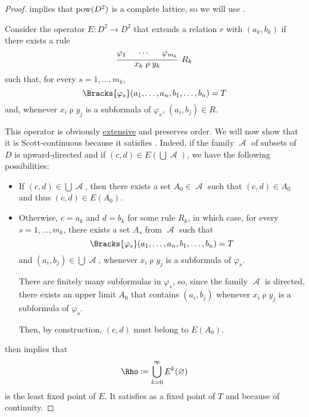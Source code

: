 \begin{proof}
   implies that \( \operatorname{pow}(D^2) \) is a complete lattice, so we will use .

  Consider the operator \( E: D^2 \to D^2 \) that extends a relation \( r \) with \( (a_k, b_k) \) if there exists a rule
  \begin{equation*}
    \begin{prooftree}
      \hypo{ \varphi_1 }
      \hypo{ \cdots }
      \hypo{ \varphi_{m_k} }
      \infer3[\( R_k \)]{ x_k \mathrel{\rho} y_k },
    \end{prooftree}
  \end{equation*}
  such that, for every \( s = 1, \ldots, m_k \),
  \begin{equation*}
    \Bracks{\varphi_s}(a_1, \ldots, a_n, b_1, \ldots, b_n) = T
  \end{equation*}
  and, whenever \( x_i \mathrel{\rho} y_j \) is a subformula of \( \varphi_s \), \( (a_i, b_j) \in R \).

  This operator is obviously \hyperref[def:extensive_function]{extensive} and preserves order. We will now show that it is Scott-continuous because it satisfies . Indeed, if the family \( \mscrA \) of subsets of \( D \) is upward-directed and if \( (c, d) \in E(\bigcup \mscrA) \), we have the following possibilities:
  \begin{itemize}
    \item If \( (c, d) \in \bigcup \mscrA \), then there exists a set \( A_0 \in \mscrA \) such that \( (c, d) \in A_0 \) and thus \( (c, d) \in E(A_0) \).

    \item Otherwise, \( c = a_k \) and \( d = b_k \) for some rule \( R_k \), in which case, for every \( s = 1, \ldots, m_k \), there exists a set \( A_s \) from \( \mscrA \) such that
    \begin{equation*}
      \Bracks{\varphi_s}(a_1, \ldots, a_n, b_1, \ldots, b_n) = T
    \end{equation*}
    and \( (a_i, b_j) \in \bigcup \mscrA \), whenever \( x_i \mathrel{\rho} y_j \) is a subformula of \( \varphi_s \).

    There are finitely many subformulas in \( \varphi_s \), so, since the family \( \mscrA \) is directed, there exists an upper limit \( A_0 \) that contains \( (a_i, b_j) \) whenever \( x_i \mathrel{\rho} y_j \) is a subformula of \( \varphi_s \).

    Then, by construction, \( (c, d) \) must belong to \( E(A_0) \).
  \end{itemize}

   then implies that
  \begin{equation*}
    \Rho \coloneqq \bigcup_{k=0}^\infty E^k(\varnothing)
  \end{equation*}
  is the least fixed point of \( E \). It satisfies  as a fixed point of \( T \) and  because of continuity.
\end{proof}

